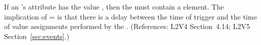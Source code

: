 If an \Event's  attribute has the value
, then the \Event must contain a \Delay element.  The
implication of = is that there
is a delay between the time of trigger and the time of value assignments
performed by the \Event.  (References: L2V4 Section~4.14; L2V5 Section~\ref{sec:events}.)
